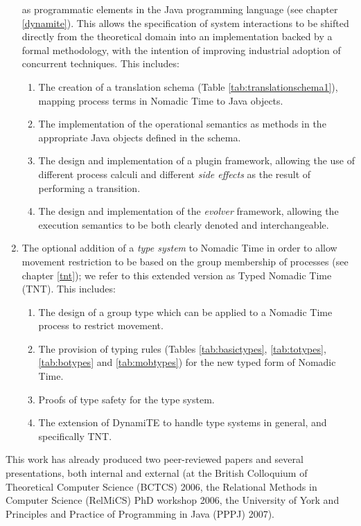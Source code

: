 \begin{enumerate}
  as programmatic elements in the Java programming language (see
  chapter \ref{dynamite}).  This allows the specification of system
  interactions to be shifted directly from the theoretical domain into
  an implementation backed by a formal methodology, with the intention
  of improving industrial adoption of concurrent techniques.  This includes:
\begin{enumerate}[\bfseries {C2.}1]
\item The creation of a translation schema (Table
  \ref{tab:translationschema1}), mapping process terms in Nomadic Time
  to Java objects.
\item The implementation of the operational semantics as methods in
  the appropriate Java objects defined in the schema.
\item The design and implementation of a plugin framework, allowing
  the use of different process calculi and different \emph{side
    effects} as the result of performing a transition.
\item The design and implementation of the \emph{evolver} framework,
  allowing the execution semantics to be both clearly denoted and
  interchangeable.
\end{enumerate}
\item The optional addition of a \emph{type system} to Nomadic Time in
  order to allow movement restriction to be based on the group
  membership of processes (see chapter \ref{tnt}); we refer to this
  extended version as Typed Nomadic Time (TNT).  This includes:
\begin{enumerate}[\bfseries {C3.}1]
\item The design of a group type which can be applied to a Nomadic
  Time process to restrict movement.
\item The provision of typing rules (Tables \ref{tab:basictypes},
  \ref{tab:totypes}, \ref{tab:botypes} and \ref{tab:mobtypes}) for the
  new typed form of Nomadic Time.
\item Proofs of type safety for the type system.
\item The extension of DynamiTE to handle type systems in general, and
  specifically TNT.
\end{enumerate}
\end{enumerate}

This work has already produced two peer-reviewed papers
\cite{nt,dynamite} and several presentations, both internal and
external (at the British Colloquium of Theoretical Computer Science
(BCTCS) 2006, the Relational Methods in Computer Science (RelMiCS) PhD
workshop 2006, the University of York and Principles and Practice of
Programming in Java (PPPJ) 2007).

